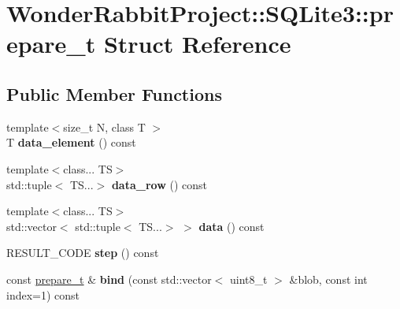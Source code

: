 \hypertarget{structWonderRabbitProject_1_1SQLite3_1_1prepare__t}{\section{Wonder\-Rabbit\-Project\-:\-:S\-Q\-Lite3\-:\-:prepare\-\_\-t Struct Reference}
\label{structWonderRabbitProject_1_1SQLite3_1_1prepare__t}
}
\subsection*{Public Member Functions}
\begin{DoxyCompactItemize}
\item 
\hypertarget{structWonderRabbitProject_1_1SQLite3_1_1prepare__t_a07e29313ff729f61147bcc4a7c0add90}{{\footnotesize template$<$size\-\_\-t N, class T $>$ }\\T {\bfseries data\-\_\-element} () const }\label{structWonderRabbitProject_1_1SQLite3_1_1prepare__t_a07e29313ff729f61147bcc4a7c0add90}

\item 
\hypertarget{structWonderRabbitProject_1_1SQLite3_1_1prepare__t_a49e3bb567c6bc630ea77d53969310e88}{{\footnotesize template$<$class... T\-S$>$ }\\std\-::tuple$<$ T\-S...$>$ {\bfseries data\-\_\-row} () const }\label{structWonderRabbitProject_1_1SQLite3_1_1prepare__t_a49e3bb567c6bc630ea77d53969310e88}

\item 
\hypertarget{structWonderRabbitProject_1_1SQLite3_1_1prepare__t_a9894a0cdc5146d4cc5b20cb5593408a4}{{\footnotesize template$<$class... T\-S$>$ }\\std\-::vector$<$ std\-::tuple$<$ T\-S...$>$ $>$ {\bfseries data} () const }\label{structWonderRabbitProject_1_1SQLite3_1_1prepare__t_a9894a0cdc5146d4cc5b20cb5593408a4}

\item 
\hypertarget{structWonderRabbitProject_1_1SQLite3_1_1prepare__t_a9ef12da27ab58e1f6d05aa44964d6219}{R\-E\-S\-U\-L\-T\-\_\-\-C\-O\-D\-E {\bfseries step} () const }\label{structWonderRabbitProject_1_1SQLite3_1_1prepare__t_a9ef12da27ab58e1f6d05aa44964d6219}

\item 
\hypertarget{structWonderRabbitProject_1_1SQLite3_1_1prepare__t_ac185e32ef8485fb9823832371f30d095}{const \hyperlink{structWonderRabbitProject_1_1SQLite3_1_1prepare__t}{prepare\-\_\-t} \& {\bfseries bind} (const std\-::vector$<$ uint8\-\_\-t $>$ \&blob, const int index=1) const }\label{structWonderRabbitProject_1_1SQLite3_1_1prepare__t_ac185e32ef8485fb9823832371f30d095}


\end{DoxyCompactItemize}
